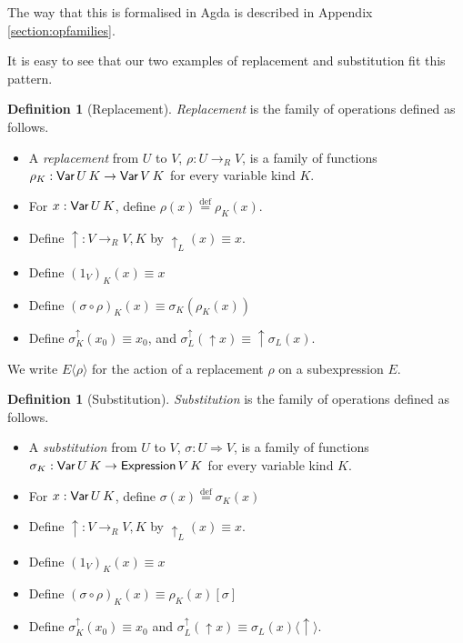 \documentclass{article}
\newcommand{\eqdef}{\ensuremath{\stackrel{\mathrm{def}}{=}}}
\theoremstyle{definition}
\newtheorem{df}[lm]{Definition}
\begin{document}
The way that this is formalised in Agda is described in Appendix \ref{section:opfamilies}.

It is easy to see that our two examples of replacement and substitution fit this pattern.

\begin{df}[Replacement]
 \emph{Replacement} is the family of operations defined as follows.
 \begin{itemize}
  \item A \emph{replacement} from $U$ to $V$, $\rho : U \rightarrow_R V$, is a family of functions $\rho_K : \AgdaDatatype{Var} \, U \, K \rightarrow
  \AgdaDatatype{Var} \, V \, K$ for every variable kind $K$.
  \item For $x : \AgdaDatatype{Var} \, U \, K$, define $\rho(x) \eqdef \rho_K(x)$.
  \item Define $\uparrow : V \rightarrow_R V , K$ by $\uparrow_L(x) \equiv x$.
  \item Define $(1_V)_K(x) \equiv x$
  \item Define $(\sigma \circ \rho)_K (x) \equiv \sigma_K (\rho_K(x))$
  \item Define $\sigma^\uparrow_K(x_0) \equiv x_0$, and $\sigma^\uparrow_L(\uparrow x) \equiv \uparrow \sigma_L(x)$.
\end{itemize}
\end{df}


We write $E \langle \rho \rangle$ for the action of a replacement $\rho$ on a subexpression $E$.

\begin{df}[Substitution]
 \emph{Substitution} is the family of operations defined as follows.
 \begin{itemize}
  \item A \emph{substitution} from $U$ to $V$, $\sigma : U \Rightarrow V$, is a family of functions $\sigma_K : \AgdaDatatype{Var} \, U \, K \rightarrow
  \AgdaDatatype{Expression} \, V \, K$ for every variable kind $K$.
  \item For $x : \AgdaDatatype{Var} \, U \, K$, define $\sigma(x) \eqdef \sigma_K(x)$
  \item Define $\uparrow : V \rightarrow_R V , K$ by $\uparrow_L(x) \equiv x$.
  \item Define $(1_V)_K(x) \equiv x$
  \item Define $(\sigma \circ \rho)_K(x) \equiv \rho_K(x) [ \sigma ]$
  \item Define $\sigma^\uparrow_K(x_0) \equiv x_0$ and $\sigma^\uparrow_L(\uparrow x) \equiv \sigma_L(x) \langle \uparrow \rangle$.
 \end{itemize}
\end{df}
\end{document}
